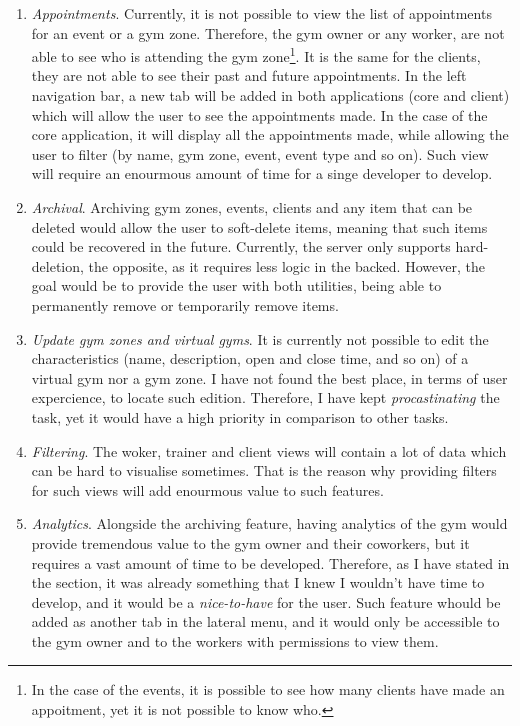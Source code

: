 \documentclass[a4paper, 12pt, oneside]{book}
\begin{document}
\begin{enumerate}[label = -]
	\item \emph{Appointments}. Currently, it is not possible to view the list of appointments for an event or a gym zone. Therefore, the gym owner or any worker, are not able to see who is attending the gym zone\footnote{In the case of the events, it is possible to see how many clients have made an appoitment, yet it is not possible to know who.}. It is the same for the clients, they are not able to see their past and future appointments.
	      \newline
	      In the left navigation bar, a new tab will be added in both applications (core and client) which will allow the user to see the appointments made. In the case of the core application, it will display all the appointments made, while allowing the user to filter (by name, gym zone, event, event type and so on). Such view will require an enourmous amount of time for a singe developer to develop.
	\item \emph{Archival}. Archiving gym zones, events, clients and any item that can be deleted would allow the user to soft-delete items, meaning that such items could be recovered in the future. Currently, the server only supports hard-deletion, the opposite, as it requires less logic in the backed. However, the goal would be to provide the user with both utilities, being able to permanently remove or temporarily remove items.
	\item \emph{Update gym zones and virtual gyms}. It is currently not possible to edit the characteristics (name, description, open and close time, and so on) of a virtual gym nor a gym zone. I have not found the best place, in terms of user expercience, to locate such edition. Therefore, I have kept \emph{procastinating} the task, yet it would have a high priority in comparison to other tasks.
	\item \emph{Filtering}. The woker, trainer and client views will contain a lot of data which can be hard to visualise sometimes. That is the reason why providing filters for such views will add enourmous value to such features.
	\item \emph{Analytics}. Alongside the archiving feature, having analytics of the gym would provide tremendous value to the gym owner and their coworkers, but it requires a vast amount of time to be developed. Therefore, as I have stated in the \emph{} section, it was already something that I knew I wouldn't have time to develop, and it would be a \emph{nice-to-have} for the user. Such feature whould be added as another tab in the lateral menu, and it would only be accessible to the gym owner and to the workers with permissions to view them.

\end{enumerate}
\end{document}
